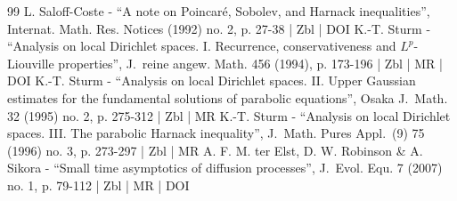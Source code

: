 \begin{thebibliography}{99}
L. Saloff-Coste - “A note on Poincaré, Sobolev, and Harnack inequalities”, Internat. Math. Res. Notices (1992) no. 2, p. 27-38 | Zbl | DOI
K.-T. Sturm - “Analysis on local Dirichlet spaces. I. Recurrence, conservativeness and $L^p$-Liouville properties”, J. reine angew. Math. 456 (1994), p. 173-196 | Zbl | MR | DOI
K.-T. Sturm - “Analysis on local Dirichlet spaces. II. Upper Gaussian estimates for the fundamental solutions of parabolic equations”, Osaka J. Math. 32 (1995) no. 2, p. 275-312 | Zbl | MR
K.-T. Sturm - “Analysis on local Dirichlet spaces. III. The parabolic Harnack inequality”, J. Math. Pures Appl. (9) 75 (1996) no. 3, p. 273-297 | Zbl | MR
A. F. M. ter Elst, D. W. Robinson \& A. Sikora - “Small time asymptotics of diffusion processes”, J. Evol. Equ. 7 (2007) no. 1, p. 79-112 | Zbl | MR | DOI
\end{thebibliography}
